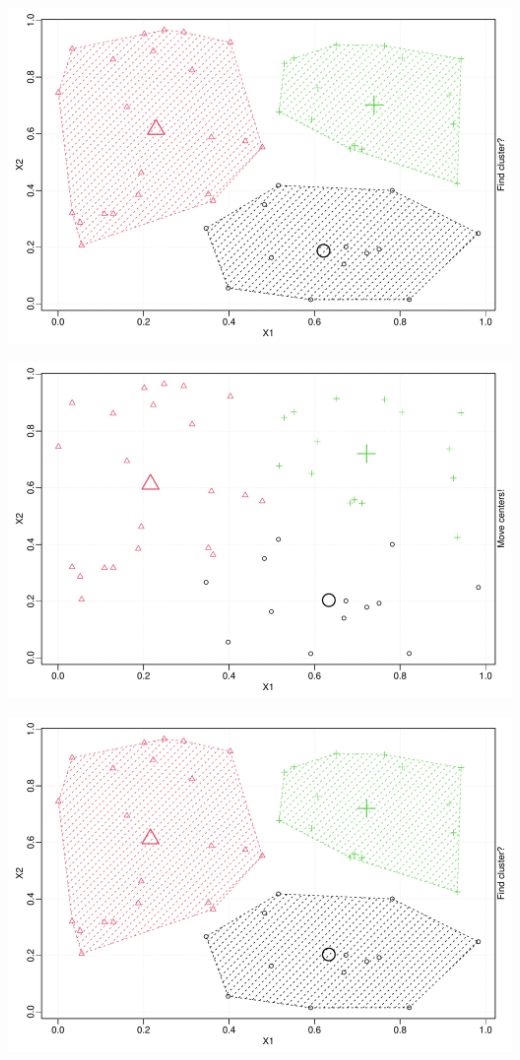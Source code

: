 \documentclass{beamer}\usepackage[]{graphicx}\usepackage[]{color}
\newenvironment{knitrout}{}{} %
\begin{document}
\begin{frame}
\begin{knitrout}
\includegraphics[width=.8\textwidth]{figures/unnamed-chunk-1-8} 

\includegraphics[width=.8\textwidth]{figures/unnamed-chunk-1-9} 

\includegraphics[width=.8\textwidth]{figures/unnamed-chunk-1-10} 

\end{knitrout}

\end{frame}
\end{document}

